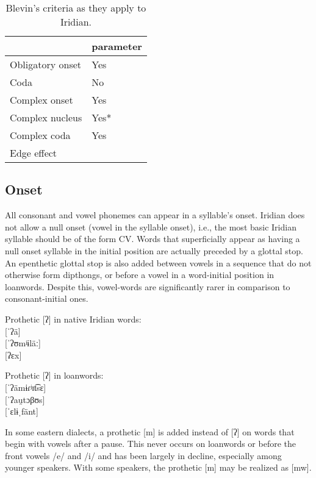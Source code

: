 \begin{table}[h!]
	\footnotesize\sffamily
	\caption{Blevin's criteria as they apply to Iridian.}
	\begin{tabularx}{0.6\textwidth}{YM}
		\toprule
		& {\sc parameter}\\
		\midrule
		Obligatory onset & Yes\\
		Coda & No\\
		Complex onset & Yes\\
		Complex nucleus & Yes*\\
		Complex coda & Yes\\
		Edge effect & \\
		\bottomrule
	\end{tabularx}
\end{table}


\subsection{Onset}

\par All consonant and vowel phonemes can appear in a syllable's onset. Iridian does not allow a null onset (vowel in the syllable onset), i.e., the most basic Iridian syllable should be of the form CV. Words that superficially appear as having a null onset syllable in the initial position are actually preceded by a glottal stop. An epenthetic glottal stop is also added between vowels in a sequence that do not otherwise form dipthongs, or before a vowel in a word-initial position in loanwords. Despite this, vowel-words are significantly rarer in comparison to consonant-initial ones.

\ex
Prothetic [ʔ] in native Iridian words:\\
 [ˈʔä]\\
 [ˈʔʊmʲɨläː]\\
 [ʔɛx]
\xe

\ex
Prothetic [ʔ] in loanwords:\\
 [ˈʔämɨɾʲɪt͡sɛ]\\
 [ˈʔau̯tɔβʊs] \\
 [ˈɛlɨˌfänt]
\xe

In some eastern dialects, a prothetic [m] is added instead of [ʔ] on words that begin with vowels after a pause. This never occurs on loanwords or before the front vowels /e/ and /i/ and has been largely in decline, especially among younger speakers. With some speakers, the prothetic [m] may be realized as [mw].

